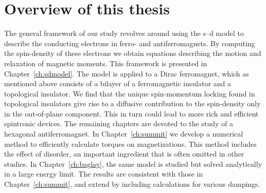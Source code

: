\section{Overview of this thesis}
The general framework of our study revolves around using the s--d model to describe the conducting electrons in ferro- and antiferromagnets. By computing the spin-density of these electrons we obtain equations describing the motion and relaxation of magnetic moments. This framework is presented in Chapter~\ref{ch:sdmodel}. The model is applied to a Dirac ferromagnet, which as mentioned above consists of a bilayer of a ferromagnetic insulator and a topological insulator. We find that the unique spin-momentum locking found in topological insulators give rise to a diffusive contribution to the spin-density only in the out-of-plane component. This in turn could lead to more rich and efficient spintronic devices. The remaining chapters are devoted to the study of a hexagonal antiferromagnet. In Chapter~\ref{ch:summit} we develop a numerical method to efficiently calculate torques on magnetizations. This method includes the effect of disorder, an important ingredient that is often omitted in other studies. In Chapter~\ref{ch:baglay}, the same model is studied but solved analytically in a large energy limit. The results are consistent with those in Chapter~\ref{ch:summit}, and extend by including calculations for various dampings. 







